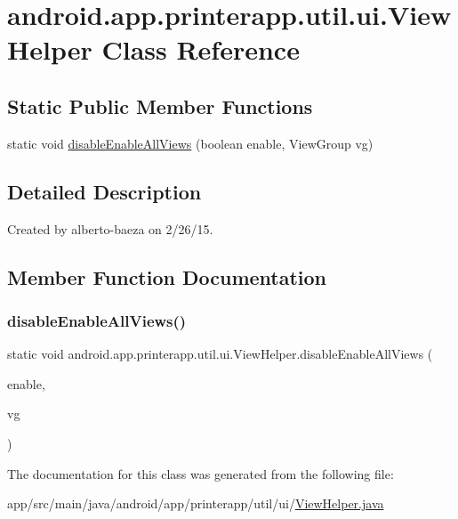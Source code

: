 \hypertarget{classandroid_1_1app_1_1printerapp_1_1util_1_1ui_1_1_view_helper}{}\section{android.\+app.\+printerapp.\+util.\+ui.\+View\+Helper Class Reference}
\label{classandroid_1_1app_1_1printerapp_1_1util_1_1ui_1_1_view_helper}
\subsection*{Static Public Member Functions}
\begin{DoxyCompactItemize}
\item 
static void \hyperlink{classandroid_1_1app_1_1printerapp_1_1util_1_1ui_1_1_view_helper_ad5babcd0817ee20e2834d34129ec8c29}{disable\+Enable\+All\+Views} (boolean enable, View\+Group vg)
\end{DoxyCompactItemize}


\subsection{Detailed Description}
Created by alberto-\/baeza on 2/26/15. 

\subsection{Member Function Documentation}
\mbox{\label{classandroid_1_1app_1_1printerapp_1_1util_1_1ui_1_1_view_helper_ad5babcd0817ee20e2834d34129ec8c29}} 
\subsubsection{\texorpdfstring{disable\+Enable\+All\+Views()}{disableEnableAllViews()}}
{\footnotesize\ttfamily static void android.\+app.\+printerapp.\+util.\+ui.\+View\+Helper.\+disable\+Enable\+All\+Views (\begin{DoxyParamCaption}\item[{boolean}]{enable,  }\item[{View\+Group}]{vg }\end{DoxyParamCaption})\hspace{0.3cm}{\ttfamily [static]}}



The documentation for this class was generated from the following file\+:\begin{DoxyCompactItemize}
\item 
app/src/main/java/android/app/printerapp/util/ui/\hyperlink{_view_helper_8java}{View\+Helper.\+java}\end{DoxyCompactItemize}
